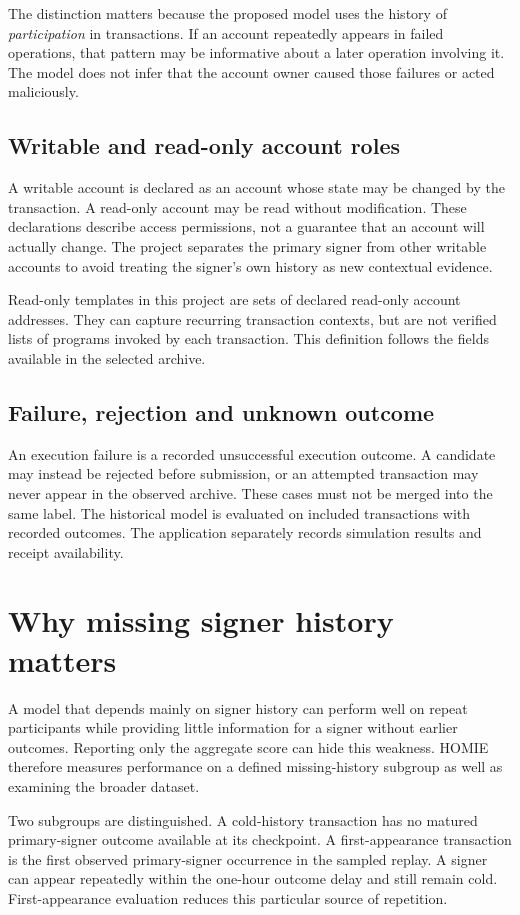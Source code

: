 \documentclass[12pt,a4paper,oneside]{report}
\begin{document}
The distinction matters because the proposed model uses the history of \emph{participation} in transactions. If an account repeatedly appears in failed operations, that pattern may be informative about a later operation involving it. The model does not infer that the account owner caused those failures or acted maliciously.
\subsection{Writable and read-only account roles}
A writable account is declared as an account whose state may be changed by the transaction. A read-only account may be read without modification. These declarations describe access permissions, not a guarantee that an account will actually change. The project separates the primary signer from other writable accounts to avoid treating the signer's own history as new contextual evidence.

Read-only templates in this project are sets of declared read-only account addresses. They can capture recurring transaction contexts, but are not verified lists of programs invoked by each transaction. This definition follows the fields available in the selected archive.
\subsection{Failure, rejection and unknown outcome}
An execution failure is a recorded unsuccessful execution outcome. A candidate may instead be rejected before submission, or an attempted transaction may never appear in the observed archive. These cases must not be merged into the same label. The historical model is evaluated on included transactions with recorded outcomes. The application separately records simulation results and receipt availability.
\section{Why missing signer history matters}
A model that depends mainly on signer history can perform well on repeat participants while providing little information for a signer without earlier outcomes. Reporting only the aggregate score can hide this weakness. HOMIE therefore measures performance on a defined missing-history subgroup as well as examining the broader dataset.

Two subgroups are distinguished. A cold-history transaction has no matured primary-signer outcome available at its checkpoint. A first-appearance transaction is the first observed primary-signer occurrence in the sampled replay. A signer can appear repeatedly within the one-hour outcome delay and still remain cold. First-appearance evaluation reduces this particular source of repetition.
\end{document}
